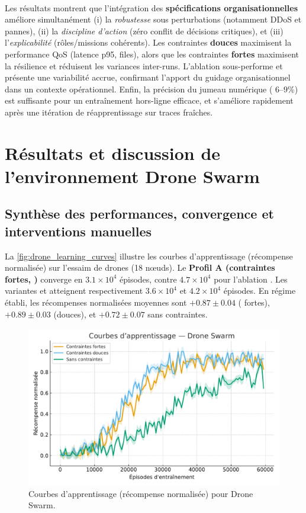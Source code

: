 \

Les résultats montrent que l'intégration des \textbf{spécifications organisationnelles} améliore simultanément (i) la \emph{robustesse} sous perturbations (notamment DDoS et pannes), (ii) la \emph{discipline d'action} (zéro conflit de décisions critiques), et (iii) l'\emph{explicabilité} (rôles/missions cohérents).
Les contraintes \textbf{douces} maximisent la performance QoS (latence p95, files), alors que les contraintes \textbf{fortes} maximisent la résilience et réduisent les variances inter-runs.
L'ablation  sous-performe et présente une variabilité accrue, confirmant l'apport du guidage organisationnel dans un contexte opérationnel.
Enfin, la précision du jumeau numérique ( $6$--$9\%$) est suffisante pour un entraînement hors-ligne efficace, et s'améliore rapidement après une itération de réapprentissage sur traces fraîches.


\section{Résultats et discussion de l'environnement Drone Swarm}\label{sec:results_and_discussion_drone_swarm}

\subsection*{Synthèse des performances, convergence et interventions manuelles}

La \autoref{fig:drone_learning_curves} illustre les courbes d'apprentissage (récompense normalisée) sur l'essaim de drones (18 nœuds).
Le \textbf{Profil A (contraintes fortes, )} converge en $3.1\times 10^4$ épisodes, contre $4.7\times 10^4$ pour l'ablation .
Les variantes  et  atteignent respectivement $3.6\times 10^4$ et $4.2\times 10^4$ épisodes.
En régime établi, les récompenses normalisées moyennes sont $+0.87 \pm 0.04$ ( fortes), $+0.89 \pm 0.03$ (douces), et $+0.72 \pm 0.07$ sans contraintes.

\begin{figure}[h!]
  \centering
  \includegraphics[width=0.75\linewidth]{figures/results_drone_learning.pdf}
  \caption[Courbes d'apprentissage (récompense normalisée) pour Drone Swarm]{Courbes d'apprentissage (récompense normalisée) pour Drone Swarm.}
  \label{fig:drone_learning_curves}
\end{figure}

